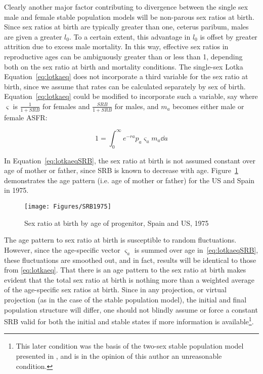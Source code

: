  \FloatBarrier
Clearly another major factor contributing to divergence between the single sex
male and female stable population models will be non-parous sex ratios at birth.
Since sex ratios at birth are typically greater than one, ceterus paribum, males
are given a greater $l_0$. To a certain extent, this advantage in $l_0$ is
offset by greater attrition due to excess male mortality. In this way, effective
sex ratios in reproductive ages can be ambiguously greater than or less than 1,
depending both on the sex ratio at birth and mortality conditions. The
single-sex Lotka Equation~\eqref{eq:lotkaeq} does not incorporate a third
variable for the sex ratio at birth, since we assume that rates can be
calculated separately by sex of birth. Equation~\eqref{eq:lotkaeq} could be
modified to incorporate such a variable, say where $\varsigma$ is
$\tfrac{1}{1+SRB}$ for females and $\tfrac{SRB}{1+SRB}$ for males, and $m_a$
becomes either male or female ASFR:

\begin{equation}
\label{eq:lotkaeqSRB}
1 = \int _0 ^\infty e^{-ra}p_a \varsigma_a m_a \dd a 
\end{equation}

In Equation~\eqref{eq:lotkaeqSRB}, the sex ratio at birth is not assumed
constant over age of mother or father, since SRB is known to decrease with age.
Figure~\ref{fig:SRB1975} demonstrates the age pattern (i.e. age of mother or
father) for the US and Spain in 1975.

\begin{figure}[ht!]
        \centering  
          \caption{Sex ratio at birth by age of progenitor, Spain
          and US, 1975}
           \texttt{[image: Figures/SRB1975]}
          \label{fig:SRB1975}
\end{figure}

The age pattern to sex ratio at birth is susceptible to random
fluctuations. However, since the age-specific vector $\varsigma _a$ is summed
over age in~\eqref{eq:lotkaeqSRB}, these fluctuations are smoothed out, and in
fact, results will be identical to those from \eqref{eq:lotkaeq}. That there is
an age pattern to the sex ratio at birth makes evident that the total sex ratio 
at birth is nothing more than a weighted
average of the age-specific sex ratios at birth. Since in any projection, or
virtual projection (as in the case of the stable population model), the initial
and final population structure will differ, one should not blindly assume or
force a constant SRB valid for both the initial and stable states
if more information is available\footnote{This later condition was the basis of
the two-sex stable population model presented in \citet{mitra1982alternative,mitra1978derivation,mitra1976effect}, and is in the
opinion of this author an unreasonable condition.}.

